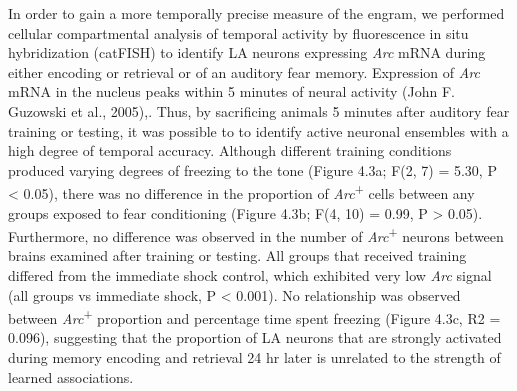 \documentclass[12pt,a4paperpaper,]{report}
\begin{document}
In order to gain a more temporally precise measure of the engram, we
performed cellular compartmental analysis of temporal activity by
fluorescence in situ hybridization (catFISH) to identify LA neurons
expressing \emph{Arc} mRNA during either encoding or retrieval or of an
auditory fear memory. Expression of \emph{Arc} mRNA in the nucleus peaks
within 5 minutes of neural activity (John F. Guzowski et al., 2005),.
Thus, by sacrificing animals 5 minutes after auditory fear training or
testing, it was possible to to identify active neuronal ensembles with a
high degree of temporal accuracy. Although different training conditions
produced varying degrees of freezing to the tone (Figure 4.3a; F(2, 7) =
5.30, P \textless{} 0.05), there was no difference in the proportion of
\emph{Arc}\textsuperscript{+} cells between any groups exposed to fear
conditioning (Figure 4.3b; F(4, 10) = 0.99, P \textgreater{} 0.05).
Furthermore, no difference was observed in the number of
\emph{Arc}\textsuperscript{+} neurons between brains examined after
training or testing. All groups that received training differed from the
immediate shock control, which exhibited very low \emph{Arc} signal (all
groups vs immediate shock, P \textless{} 0.001). No relationship was
observed between \emph{Arc}\textsuperscript{+} proportion and percentage
time spent freezing (Figure 4.3c, R2 = 0.096), suggesting that the
proportion of LA neurons that are strongly activated during memory
encoding and retrieval 24 hr later is unrelated to the strength of
learned associations.
\end{document}
